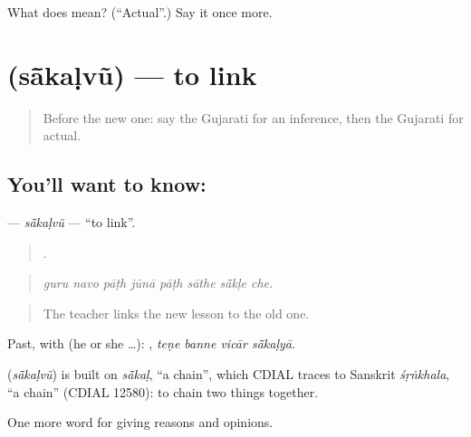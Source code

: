 \begin{tcolorbox}[breakable,colback=teal!4,colframe=teal!35!black,title={Before you move on}]
What does  mean? (\textquotedblleft{}Actual\textquotedblright{}.) Say it once more.
\end{tcolorbox}
\section[\texorpdfstring{\gu{સાંકળવું} (sā̃kaḷvũ)}{સાંકળવું (sā̃kaḷvũ)}]{ (sā̃kaḷvũ) — to link}

\label{lesson:GU-C365-sakalvu}



\begin{quote}
Before the new one: say the Gujarati for an inference, then the Gujarati for actual.
\end{quote}

\subsection*{You'll want to know: }
\textbf{} — \emph{sā̃kaḷvũ} — \textquotedblleft{}to link\textquotedblright{}.

\begin{quote}
       .
\end{quote}

\begin{quote}
\emph{guru navo pāṭh jūnā pāṭh sāthe sā̃kḷe che.}
\end{quote}

\begin{quote}
The teacher links the new lesson to the old one.
\end{quote}

Past, with  (he or she …):    , \emph{teṇe banne vicār sā̃kaḷyā}.

\begin{cousinweb}
\textbf{} (\emph{sā̃kaḷvũ}) is built on \emph{sā̃kaḷ}, \textquotedblleft{}a chain\textquotedblright{}, which CDIAL traces to Sanskrit \emph{śṛṅkhala}, \textquotedblleft{}a chain\textquotedblright{} (CDIAL 12580): to chain two things together.
\end{cousinweb}

\begin{grammarlens}[title={What you've built}]
One more word for giving reasons and opinions.
\end{grammarlens}

